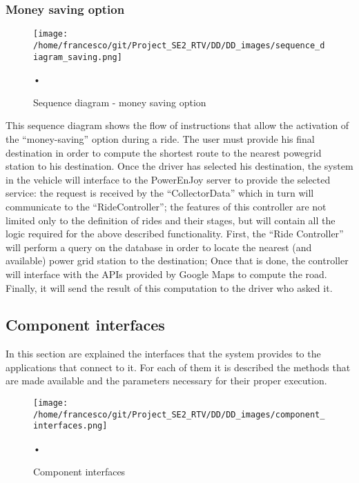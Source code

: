 \documentclass[10pt, a4paper,titlepage]{article}
\begin{document}
\subsubsection{Money saving option}
\begin{figure}[h]
\begin{center}
\texttt{[image: /home/francesco/git/Project\_SE2\_RTV/DD/DD\_images/sequence\_diagram\_saving.png]}
\caption{Sequence diagram - money saving option}
\label{fig:sequence_diagram_saving}
\end{center}•
\end{figure}
This sequence diagram shows the flow of instructions that allow the activation of the “money-saving” option during a ride.
The user must provide his final destination in order to compute the shortest route to the nearest powegrid station to his destination.
Once the driver has selected his destination, the system in the vehicle will interface to the PowerEnJoy server to provide the selected service: the request is received by the “CollectorData” which in turn will communicate to the “RideController”; the features of this controller are not limited only to the definition of rides and their stages, but will contain all the logic required for the above described functionality.
First, the “Ride Controller” will perform a query on the database in order to locate the nearest (and available) power grid station to the destination; Once that is done, the controller will interface with the APIs provided by Google Maps to compute the road.
Finally, it will send the result of this computation to the driver who asked it.
\clearpage
\subsection{Component interfaces}
In this section are explained the interfaces that the system provides to the applications that connect to it. For each of them it is described the methods that are made available and the parameters necessary for their proper execution.
\begin{figure}[h]
\begin{center}
\texttt{[image: /home/francesco/git/Project\_SE2\_RTV/DD/DD\_images/component\_interfaces.png]}
\caption{Component interfaces}
\label{fig:scomponent_interfaces}
\end{center}•
\end{figure}
\enddocument
\end{document}
